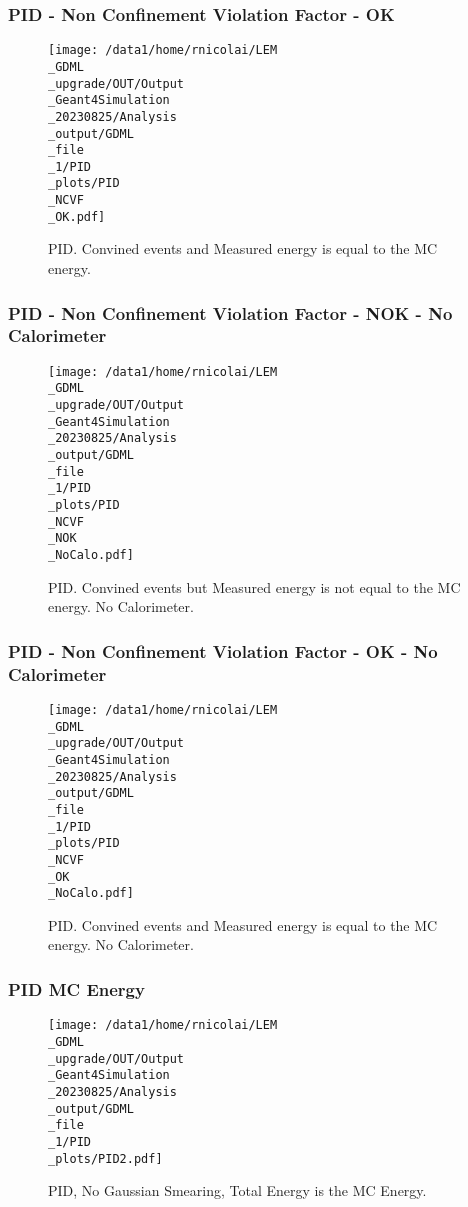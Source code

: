 \documentclass[8pt]{beamer}
\begin{document}
            \begin{frame}
                \frametitle{PID - Non Confinement Violation Factor - OK}
            
        \begin{figure}[h]
            \centering
            \texttt{[image: /data1/home/rnicolai/LEM\\\_GDML\\\_upgrade/OUT/Output\\\_Geant4Simulation\\\_20230825/Analysis\\\_output/GDML\\\_file\\\_1/PID\\\_plots/PID\\\_NCVF\\\_OK.pdf]}
            \caption{PID. Convined events and Measured energy is equal to the MC energy.}
        \end{figure}
        
            \end{frame}
            
            \begin{frame}
                \frametitle{PID - Non Confinement Violation Factor - NOK - No Calorimeter}
            
        \begin{figure}[h]
            \centering
            \texttt{[image: /data1/home/rnicolai/LEM\\\_GDML\\\_upgrade/OUT/Output\\\_Geant4Simulation\\\_20230825/Analysis\\\_output/GDML\\\_file\\\_1/PID\\\_plots/PID\\\_NCVF\\\_NOK\\\_NoCalo.pdf]}
            \caption{PID. Convined events but Measured energy is not equal to the MC energy. No Calorimeter.}
        \end{figure}
        
            \end{frame}
            
            \begin{frame}
                \frametitle{PID - Non Confinement Violation Factor - OK - No Calorimeter}
            
        \begin{figure}[h]
            \centering
            \texttt{[image: /data1/home/rnicolai/LEM\\\_GDML\\\_upgrade/OUT/Output\\\_Geant4Simulation\\\_20230825/Analysis\\\_output/GDML\\\_file\\\_1/PID\\\_plots/PID\\\_NCVF\\\_OK\\\_NoCalo.pdf]}
            \caption{PID. Convined events and Measured energy is equal to the MC energy. No Calorimeter.}
        \end{figure}
        
            \end{frame}
            
            \begin{frame}
                \frametitle{PID MC Energy}
            
        \begin{figure}[h]
            \centering
            \texttt{[image: /data1/home/rnicolai/LEM\\\_GDML\\\_upgrade/OUT/Output\\\_Geant4Simulation\\\_20230825/Analysis\\\_output/GDML\\\_file\\\_1/PID\\\_plots/PID2.pdf]}
            \caption{PID, No Gaussian Smearing, Total Energy is the MC Energy.}
        \end{figure}
        
            \end{frame}
            
\end{document}
